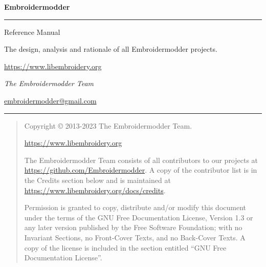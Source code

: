 \begin{titlepage}

\vspace*{8cm}

\noindent\textbf{\Huge Embroidermodder}

\vspace{10pt}

\noindent\rule{\linewidth}{2pt}

\vspace{10pt}

\begin{flushright}
\Large
    Reference Manual

\normalsize
    The design, analysis and rationale of all Embroidermodder projects.

\embversion

\vspace{10pt}

\url{https://www.libembroidery.org}

\publicationdate
\end{flushright}

\vspace{6cm}

\begin{flushleft}
\Large
\emph{The Embroidermodder Team}

\url{embroidermodder@gmail.com}

\vspace{10pt}

\noindent\rule{\linewidth}{1pt}

\end{flushleft}
    
\end{titlepage}


\vspace*{8cm}

\begin{quote}
Copyright \copyright{} 2013-2023 The Embroidermodder Team.

\url{https://www.libembroidery.org}

The Embroidermodder Team consists of all contributors to our projects
at \url{https://github.com/Embroidermodder}. A copy of the contributor
list is in the Credits section below
and is maintained at \url{https://www.libembroidery.org/docs/credits}.

\bigskip

Permission is granted to copy, distribute and/or modify this document
under the terms of the GNU Free Documentation License, Version 1.3
or any later version published by the Free Software Foundation;
with no Invariant Sections, no Front-Cover Texts, and no Back-Cover Texts.
A copy of the license is included in the section entitled ``GNU
Free Documentation License''.
\end{quote}

